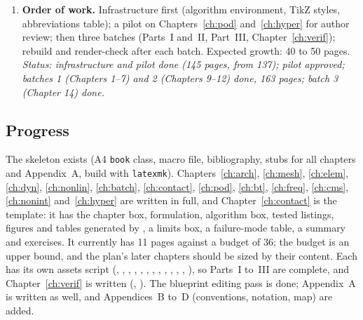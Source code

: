 \begin{enumerate}
\item \textbf{Order of work.} Infrastructure first (algorithm environment, TikZ styles, abbreviations table); a pilot on Chapters~\ref{ch:pod} and~\ref{ch:hyper} for author review; then three batches (Parts~I and~II, Part~III, Chapter~\ref{ch:verif}); rebuild and render-check after each batch. Expected growth: 40 to 50 pages. \emph{Status: infrastructure and pilot done (145 pages, from 137); pilot approved; batches 1 (Chapters 1--7) and 2 (Chapters 9--12) done, 163 pages; batch 3 (Chapter 14) done.}
\end{enumerate}
\subsection{Progress}
The  skeleton exists (A4 \texttt{book} class, macro file, bibliography, stubs for all chapters and Appendix~A, build with \texttt{latexmk}). Chapters~\ref{ch:arch}, \ref{ch:mesh}, \ref{ch:elem}, \ref{ch:dyn}, \ref{ch:nonlin}, \ref{ch:batch}, \ref{ch:contact}, \ref{ch:pod}, \ref{ch:bt}, \ref{ch:freq}, \ref{ch:cms}, \ref{ch:nonint} and~\ref{ch:hyper} are written in full, and Chapter~\ref{ch:contact} is the template: it has the chapter box, formulation, algorithm box, tested listings, figures and tables generated by , a limits box, a failure-mode table, a summary and exercises. It currently has 11 pages against a budget of 36; the budget is an upper bound, and the plan's later chapters should be sized by their content. Each has its own assets script (, , , , , , , , , , , , ), so Parts~I to~III are complete, and Chapter~\ref{ch:verif} is written (, ). The blueprint editing pass is done; Appendix~A is written as well, and Appendices~B to~D (conventions, notation, map) are added.
